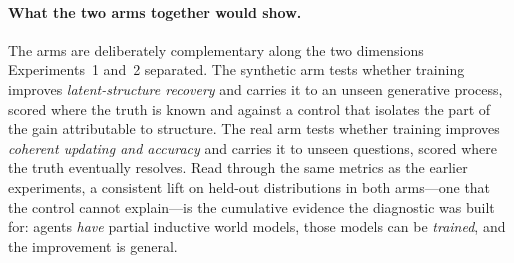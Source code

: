 \paragraph{What the two arms together would show.}  The arms are deliberately complementary along the
two dimensions Experiments~1 and~2 separated. The synthetic arm tests whether training improves
\emph{latent-structure recovery} and carries it to an unseen generative process, scored where the truth
is known and against a control that isolates the part of the gain attributable to structure. The real arm
tests whether training improves \emph{coherent updating and accuracy} and carries it to unseen questions,
scored where the truth eventually resolves. Read through the same metrics as the earlier experiments, a
consistent lift on held-out distributions in both arms---one that the control cannot explain---is the
cumulative evidence the diagnostic was built for: agents \emph{have} partial inductive world models,
those models can be \emph{trained}, and the improvement is general.

